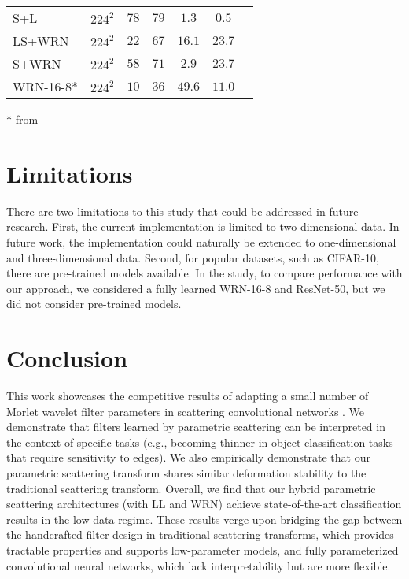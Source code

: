 \documentclass[10pt,twocolumn,letterpaper]{article}
\begin{document}
\begin{table}
{\begin{tabular}{lcccccl}
    S+L & $224^2$ & $78$ &	$79$ &  $	1.3	$	& $0.5$ &\\
    LS+WRN & $224^2$ &	$22$ & $67$	& 
    $	16.1	$	& $23.7$ &\\
    S+WRN & $224^2$ & $58$	& $71$ & 
    $	2.9	$	& $23.7$ &\\
    WRN-16-8* & $224^2$ & $10$ & $36$ & $	49.6	$	& $11.0$ &\\
    \hline
    \end{tabular}}
    \begin{flushleft}
\scriptsize
\vspace{-7pt}
\hspace{18pt}$*$ from \cite{zagoruyko2016wide}\\
\end{flushleft}
\vspace{-18pt}
\end{table}


\section{Limitations}
There are two limitations to this study that could be addressed in future research. First, the current implementation is limited to two-dimensional data. In future work, the implementation could naturally be extended to one-dimensional and three-dimensional data. Second, for popular datasets, such as CIFAR-10, there are pre-trained models available.  In the study, to compare performance with our approach, we considered a fully learned WRN-16-8 and ResNet-50, but we did not consider pre-trained models. 


\section{Conclusion}
\label{sec:conclusion}


This work showcases the competitive results of adapting a small number of Morlet wavelet filter parameters in scattering convolutional networks \cite{bruna2013invariant}. We demonstrate that filters learned by parametric scattering can be interpreted in the context of specific tasks (e.g., becoming thinner in object classification tasks that require sensitivity to edges). We also empirically demonstrate that our parametric scattering transform shares similar deformation stability to the traditional scattering transform. Overall, we find that our hybrid parametric scattering architectures (with LL and WRN) achieve state-of-the-art classification results in the low-data regime. These results verge upon bridging the gap between the handcrafted filter design in traditional scattering transforms, which provides tractable properties and supports low-parameter models, and fully parameterized convolutional neural networks, which lack interpretability but are more flexible.
\end{document}
